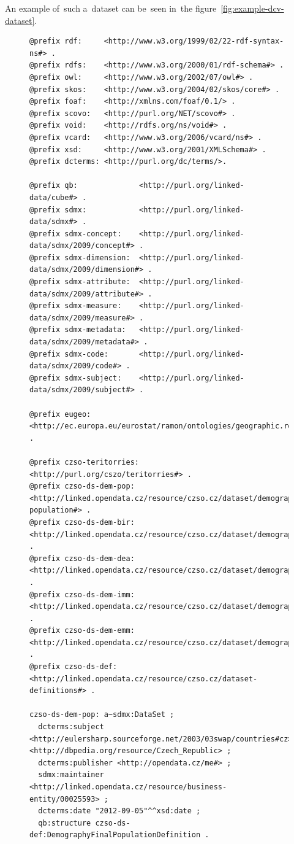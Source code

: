 An example of~such a~dataset can be~seen in~the 
figure~\ref{fig:example-dcv-dataset}.

\begin{figure}
\tiny\begin{verbatim}
@prefix rdf:     <http://www.w3.org/1999/02/22-rdf-syntax-ns#> .
@prefix rdfs:    <http://www.w3.org/2000/01/rdf-schema#> .
@prefix owl:     <http://www.w3.org/2002/07/owl#> .
@prefix skos:    <http://www.w3.org/2004/02/skos/core#> .
@prefix foaf:    <http://xmlns.com/foaf/0.1/> .
@prefix scovo:   <http://purl.org/NET/scovo#> .
@prefix void:    <http://rdfs.org/ns/void#> .
@prefix vcard:   <http://www.w3.org/2006/vcard/ns#> .
@prefix xsd:     <http://www.w3.org/2001/XMLSchema#> .
@prefix dcterms: <http://purl.org/dc/terms/>.

@prefix qb:              <http://purl.org/linked-data/cube#> .
@prefix sdmx:            <http://purl.org/linked-data/sdmx#> .
@prefix sdmx-concept:    <http://purl.org/linked-data/sdmx/2009/concept#> .
@prefix sdmx-dimension:  <http://purl.org/linked-data/sdmx/2009/dimension#> .
@prefix sdmx-attribute:  <http://purl.org/linked-data/sdmx/2009/attribute#> .
@prefix sdmx-measure:    <http://purl.org/linked-data/sdmx/2009/measure#> .
@prefix sdmx-metadata:   <http://purl.org/linked-data/sdmx/2009/metadata#> .
@prefix sdmx-code:       <http://purl.org/linked-data/sdmx/2009/code#> .
@prefix sdmx-subject:    <http://purl.org/linked-data/sdmx/2009/subject#> .

@prefix eugeo: <http://ec.europa.eu/eurostat/ramon/ontologies/geographic.rdf#> .

@prefix czso-teritorries:  <http://purl.org/cszo/teritorries#> .
@prefix czso-ds-dem-pop:   <http://linked.opendata.cz/resource/czso.cz/dataset/demography/final-population#> .
@prefix czso-ds-dem-bir:   <http://linked.opendata.cz/resource/czso.cz/dataset/demography/births#> .
@prefix czso-ds-dem-dea:   <http://linked.opendata.cz/resource/czso.cz/dataset/demography/deaths#> .
@prefix czso-ds-dem-imm:   <http://linked.opendata.cz/resource/czso.cz/dataset/demography/immigrants#> .
@prefix czso-ds-dem-emm:   <http://linked.opendata.cz/resource/czso.cz/dataset/demography/emmigrants#> .
@prefix czso-ds-def:       <http://linked.opendata.cz/resource/czso.cz/dataset-definitions#> .

czso-ds-dem-pop: a~sdmx:DataSet ;
  dcterms:subject <http://eulersharp.sourceforge.net/2003/03swap/countries#cz>, <http://dbpedia.org/resource/Czech_Republic> ;
  dcterms:publisher <http://opendata.cz/me#> ;
  sdmx:maintainer <http://linked.opendata.cz/resource/business-entity/00025593> ;
  dcterms:date "2012-09-05"^^xsd:date ;
  qb:structure czso-ds-def:DemographyFinalPopulationDefinition .
  

\end{verbatim}
\end{figure}
